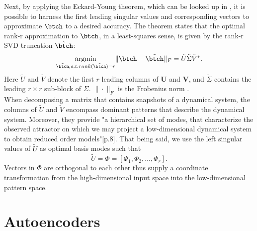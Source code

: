 Next, by applying the Eckard-Young theorem, which can be looked up in \cite{Kutz}, it is possible to harness the first leading singular values and corresponding vectors to approximate \(\btch\) to a desired accuracy. The theorem states that the optimal rank-r approximation to $\btch$, in a least-squares sense, is given by the rank-r SVD truncation \(\tilde{\btch}\):
\begin{equation}
\underset{\tilde{\btch}, s.t. rank(\tilde{\btch})=r}{\operatorname{argmin}} \| 
\btch -\tilde{\btch}\|_F
=\tilde{U}\tilde{\Sigma}\tilde{V}^*\mathrm{.}
\label{Eq:EckardYoung}
\end{equation} 
Here \(\tilde{U}\) and \(\tilde{V}\) denote the first \(r\) leading columns of \(\mathbf{U}\) and \(\mathbf{V}\), and \(\tilde{\Sigma}\) contains the leading \(r \times r\) sub-block of \(\Sigma\). \(\|\cdot\|_F\) is the Frobenius norm \cite{Kutz}.\\
When decomposing a matrix that contains snapshots of a dynamical system, the columns of \(\tilde{U}\) and \(\tilde{V}\) encompass dominant patterns that describe the dynamical system. Moreover, they provide "a hierarchical set of modes, that characterize the observed attractor on which we may project a low-dimensional dynamical system to obtain reduced order models"\cite{Kutz}[p.8]. That being said, we use the left singular values of \(\tilde{U}\) as optimal basis modes such that
\begin{equation}
	\tilde{U} = \Phi = \left[\Phi_1,\Phi_2,\dots,\Phi_r\right]\mathrm{.}
\end{equation}
Vectors in \(\Phi\) are orthogonal to each other thus supply a coordinate transformation from the high-dimensional input space into the low-dimensional pattern space.
\section{Autoencoders}
\label{Sec:AE}

